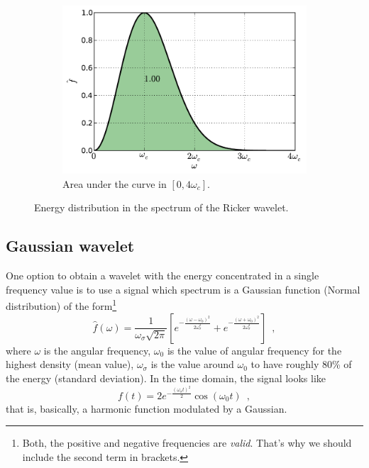 \documentclass[12pt,letterpaper]{article}
\begin{document}
{\begin{figure}[H]
\begin{subfigure}[b]{0.45\textwidth}
        \includegraphics[width=\textwidth]{img/ricker_area=4.pdf}
        \caption{Area under the curve in $[0,4\omega_c]$.}
    \end{subfigure}
    \caption{Energy distribution in the spectrum of the Ricker wavelet.}
    \label{fig:ricker-areas}
\end{figure}

\subsection{Gaussian wavelet}
One option to obtain a wavelet with the energy concentrated in a single frequency value is to use a signal which spectrum is a Gaussian function (Normal distribution) of the form\footnote{Both, the positive and negative frequencies are \textit{valid}. That's why we should include the second term in brackets.}
\begin{equation}\label{eq:gaussian_freq}
\hat{f}(\omega)=\frac{1}{\omega_\sigma \sqrt{2\pi}} \left[e^{-\frac{(\omega - \omega_0)^2}{2\omega_\sigma^2}}+ e^{-\frac{(\omega + \omega_0)^2}{2\omega_\sigma^2}} \right] \enspace ,
\end{equation}
where \(\omega\) is the angular frequency, \(\omega_0\) is the value of angular frequency for the highest density (mean value), \(\omega_\sigma\) is the value around \(\omega_0\) to have roughly 80\% of the energy (standard deviation). In the time domain, the signal looks like
\begin{equation}\label{eq:gaussian_time}
f(t) = 2 e^{-\frac{(\omega_\sigma t)^2}{2}}\cos(\omega_0 t) \enspace ,
\end{equation}
that is, basically, a harmonic function modulated by a Gaussian.

}
\end{document}
